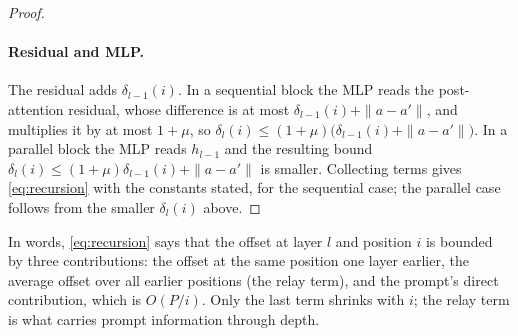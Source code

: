 \documentclass[11pt]{article}
\theoremstyle{definition}
\theoremstyle{remark}
\begin{document}
\begin{proof}
\paragraph{Residual and MLP.} The residual adds $\delta_{l-1}(i)$. In a sequential block the MLP reads the post-attention residual, whose difference is at most $\delta_{l-1}(i)+\|a-a'\|$, and multiplies it by at most $1+\mu$, so $\delta_l(i)\le(1+\mu)\big(\delta_{l-1}(i)+\|a-a'\|\big)$. In a parallel block the MLP reads $h_{l-1}$ and the resulting bound $\delta_l(i)\le(1+\mu)\delta_{l-1}(i)+\|a-a'\|$ is smaller. Collecting terms gives \eqref{eq:recursion} with the constants stated, for the sequential case; the parallel case follows from the smaller $\delta_l(i)$ above.
\end{proof}

In words, \eqref{eq:recursion} says that the offset at layer $l$ and position $i$ is bounded by three contributions: the offset at the same position one layer earlier, the average offset over all earlier positions (the relay term), and the prompt's direct contribution, which is $O(P/i)$. Only the last term shrinks with $i$; the relay term is what carries prompt information through depth.
\end{document}
